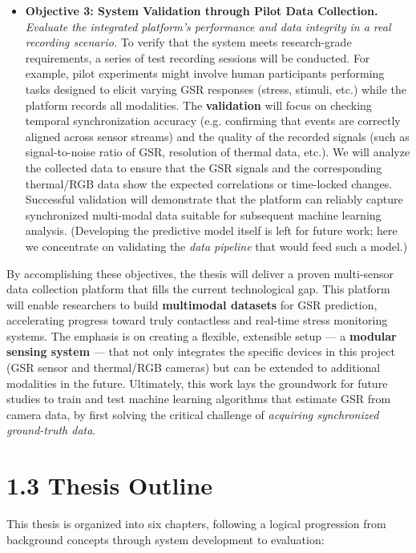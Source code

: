 \begin{itemize}
\item \textbf{Objective 3: System Validation through Pilot Data Collection.}
  \textit{Evaluate the integrated platform's performance and data integrity in
  a real recording scenario.} To verify that the system meets
  research-grade requirements, a series of test recording sessions will
  be conducted. For example, pilot experiments might involve human
  participants performing tasks designed to elicit varying GSR responses
  (stress, stimuli, etc.) while the platform records all modalities. The
  \textbf{validation} will focus on checking temporal synchronization
  accuracy (e.g. confirming that events are correctly aligned across
  sensor streams) and the quality of the recorded signals (such as
  signal-to-noise ratio of GSR, resolution of thermal data, etc.). We
  will analyze the collected data to ensure that the GSR signals and the
  corresponding thermal/RGB data show the expected correlations or
  time-locked changes. Successful validation will demonstrate that the
  platform can reliably capture synchronized multi-modal data suitable
  for subsequent machine learning analysis. (Developing the predictive
  model itself is left for future work; here we concentrate on
  validating the \textit{data pipeline} that would feed such a model.)

\end{itemize}
By accomplishing these objectives, the thesis will deliver a proven
multi-sensor data collection platform that fills the current
technological gap. This platform will enable researchers to build
\textbf{multimodal datasets} for GSR prediction, accelerating progress toward
truly contactless and real-time stress monitoring systems. The emphasis
is on creating a flexible, extensible setup --- a \textbf{modular sensing
system} --- that not only integrates the specific devices in this
project (GSR sensor and thermal/RGB cameras) but can be extended to
additional modalities in the future. Ultimately, this work lays the
groundwork for future studies to train and test machine learning
algorithms that estimate GSR from camera data, by first solving the
critical challenge of \textit{acquiring synchronized ground-truth data}.

\section{1.3 Thesis Outline}

This thesis is organized into six chapters, following a logical
progression from background concepts through system development to
evaluation:

